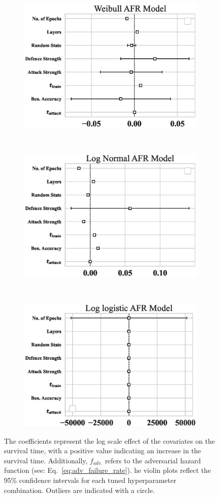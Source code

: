 \begin{figure}[!h]
    \begin{subfigure}
        \centering
        \includegraphics[width=.32\textwidth]{cifar/weibull_aft.eps}
    \end{subfigure}
    ~
    \begin{subfigure}
        \centering
        \includegraphics[width=.32\textwidth]{cifar/log_normal_aft.eps}
    \end{subfigure}
    ~
    \begin{subfigure}
        \centering
        \includegraphics[width=.32\textwidth]{cifar/log_logistic_aft.eps}
    \end{subfigure}

    \caption{The coefficients represent the log scale effect of the covariates on the survival time, with a positive value indicating an increase in the survival time. Additionally, $f_{adv.}$ refers to the adversarial hazard function (see: Eq.~\ref{eq:adv_failure_rate}). he violin plots reflect the 95\% confidence intervals for each tuned hyperparameter combination. Outliers are indicated with a circle.}
    \label{fig:cifar_afr_models}
\end{figure}

